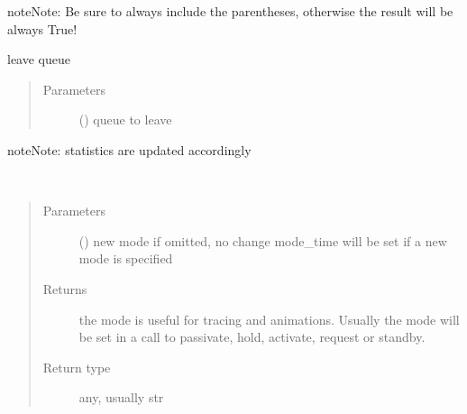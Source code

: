 \documentclass[letterpaper,10pt,english]{sphinxmanual}
\begin{document}
\begin{fulllineitems}
\begin{fulllineitems}
\begin{sphinxadmonition}{note}{Note:}
Be sure to always include the parentheses, otherwise the result will be always True!
\end{sphinxadmonition}

\end{fulllineitems}


\begin{fulllineitems}
\label{\detokenize{Reference:salabim.Component.leave}}
leave queue
\begin{quote}\begin{description}
\item[{Parameters}] \leavevmode
{} ({\hyperref[\detokenize{Reference:salabim.Queue}]{}}) \textendash{} queue to leave

\end{description}\end{quote}

\begin{sphinxadmonition}{note}{Note:}
statistics are updated accordingly
\end{sphinxadmonition}

\end{fulllineitems}


\begin{fulllineitems}
\label{\detokenize{Reference:salabim.Component.mode}}~\begin{quote}\begin{description}
\item[{Parameters}] \leavevmode
{} (\sphinxstyleliteralemphasis{, }) \textendash{} new mode 
if omitted, no change 
mode\_time will be set if a new mode is specified

\item[{Returns}] \leavevmode
{} \textendash{} the mode is useful for tracing and animations. 
Usually the mode will be set in a call to passivate, hold, activate, request or standby.

\item[{Return type}] \leavevmode
any, usually str


\end{description}
\end{quote}
\end{fulllineitems}
\end{fulllineitems}
\end{document}
